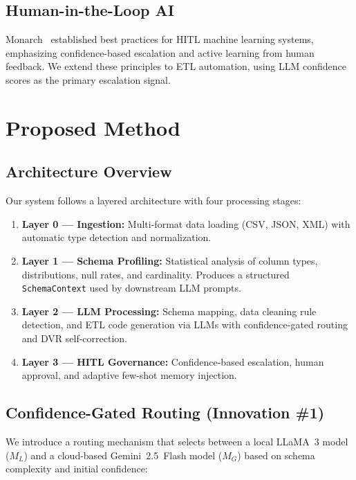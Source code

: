 \documentclass[conference]{IEEEtran}
\begin{document}
\subsection{Human-in-the-Loop AI}
Monarch~\cite{monarch2021} established best practices for HITL machine
learning systems, emphasizing confidence-based escalation and active learning
from human feedback. We extend these principles to ETL automation, using
LLM confidence scores as the primary escalation signal.

\section{Proposed Method}
\label{sec:method}

\subsection{Architecture Overview}

Our system follows a layered architecture with four processing stages:

\begin{enumerate}
\item \textbf{Layer 0 --- Ingestion:} Multi-format data loading (CSV, JSON, XML)
with automatic type detection and normalization.
\item \textbf{Layer 1 --- Schema Profiling:} Statistical analysis of column
types, distributions, null rates, and cardinality. Produces a structured
\texttt{SchemaContext} used by downstream LLM prompts.
\item \textbf{Layer 2 --- LLM Processing:} Schema mapping, data cleaning rule
detection, and ETL code generation via LLMs with confidence-gated routing
and DVR self-correction.
\item \textbf{Layer 3 --- HITL Governance:} Confidence-based escalation,
human approval, and adaptive few-shot memory injection.
\end{enumerate}

\subsection{Confidence-Gated Routing (Innovation \#1)}
\label{sec:routing}

We introduce a routing mechanism that selects between a local LLaMA~3 model
($M_L$) and a cloud-based Gemini~2.5~Flash model ($M_G$) based on schema
complexity and initial confidence:
\end{document}
